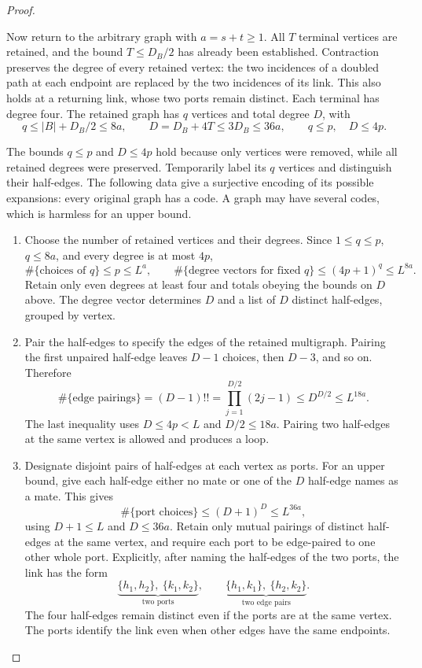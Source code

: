 \documentclass[11pt]{article}
\theoremstyle{definition}
\theoremstyle{remark}
\theoremstyle{plain}
\begin{document}
\begin{proof}


\begin{samepage}
Now return to the arbitrary graph with $a=s+t\ge1$.
All $T$ terminal vertices are retained, and the bound
$T\le D_B/2$ has already been established. Contraction preserves the degree of every retained
vertex: the two incidences of a doubled path at each endpoint are
replaced by the two incidences of its link. This also holds at a
returning link, whose two ports remain distinct. Each terminal has
degree four.
The retained graph has \(q\) vertices and total degree \(D\), with
\begin{equation}\label{eq:retained-graph}
 q\le |B|+D_B/2\le8a,\qquad
 D=D_B+4T\le3D_B\le36a,\qquad q\le p,\quad D\le4p.
\end{equation}
\end{samepage}
The bounds $q\le p$ and $D\le4p$ hold because only vertices were
removed, while all retained degrees were preserved.
Temporarily label its \(q\) vertices and distinguish their half-edges.
The following data give a surjective encoding of its possible
expansions: every original graph has a code. A graph may have
several codes, which is harmless for an upper bound.

\begin{enumerate}
\item Choose the number of retained vertices and their degrees.
Since $1\le q\le p$, $q\le8a$, and every degree is at most $4p$,
\[
 \#\{\text{choices of }q\}\le p\le L^a,\qquad
 \#\{\text{degree vectors for fixed }q\}\le(4p+1)^q\le L^{8a}.
\]
Retain only even degrees at least four and totals obeying the
bounds on $D$ above. The degree vector determines $D$ and a list
of $D$ distinct half-edges, grouped by vertex.

\item Pair the half-edges to specify the edges of the retained
multigraph. Pairing the first unpaired half-edge leaves $D-1$
choices, then $D-3$, and so on. Therefore
\[
 \#\{\text{edge pairings}\}=(D-1)!!
 =\prod_{j=1}^{D/2}(2j-1)\le D^{D/2}\le L^{18a}.
\]
The last inequality uses $D\le4p<L$ and $D/2\le18a$.
Pairing two half-edges at the same vertex is allowed and produces a loop.

\item Designate disjoint pairs of half-edges at each vertex as ports.
For an upper bound, give each half-edge either no mate or one of
the $D$ half-edge names as a mate. This gives
\[
 \#\{\text{port choices}\}\le(D+1)^D\le L^{36a},
\]
using $D+1\le L$ and $D\le36a$. Retain only mutual pairings of
distinct half-edges at the same vertex, and require each port to
be edge-paired to one other whole port. Explicitly, after naming
the half-edges of the two ports, the link has the form
\[
 \underbrace{\{h_1,h_2\},\ \{k_1,k_2\}}_{\text{two ports}},
 \qquad
 \underbrace{\{h_1,k_1\},\ \{h_2,k_2\}}_{\text{two edge pairs}}.
\]
The four half-edges remain distinct even if the ports are at the
same vertex. The ports identify the link even when other edges
have the same endpoints.


\end{enumerate}
\end{proof}
\end{document}
